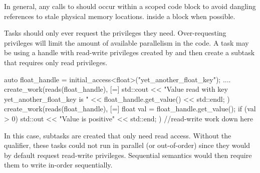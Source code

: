 In general, any calls to  should occur 
within a scoped code block to avoid dangling references to stale physical memory locations.
inside a  block when possible.



Tasks should only ever request the privileges they need. 
Over-requesting privileges will limit the amount of available parallelism in the code.
A task may be using a handle with read-write privileges created by 
and then create a subtask that requires only read privileges.

\begin{CppCode}
auto float_handle = initial_access<float>("yet_another_float_key");
....
create_work(reads(float_handle), [=] {
  std::cout << "Value read with key yet_another_float_key is " 
          << float_handle.get_value() << std::endl;
})
create_work(reads(float_handle), [=] {
  float val = float_handle.get_value();
  if (val > 0) std::out << "Value is positive" << std::end;
})
//read-write work down here
\end{CppCode}
In this case, subtasks are created that only need read access. 
Without the  qualifier, these tasks could not run in parallel (or out-of-order) since they
would by default request read-write privileges.
Sequential semantics would then require them to write in-order sequentially.

